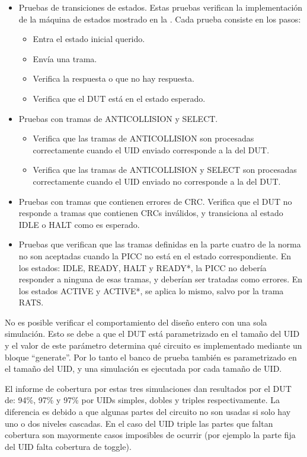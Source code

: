 \documentclass[a4paper, twoside, 11pt]{report}
\begin{document}
\begin{itemize}
  \item Pruebas de transiciones de estados. Estas pruebas verifican la implementación de la máquina de estados mostrado en la . Cada prueba consiste en los pasos:
  \begin{itemize}
    \item Entra el estado inicial querido.
    \item Envía una trama.
    \item Verifica la respuesta o que no hay respuesta.
    \item Verifica que el DUT está en el estado esperado.
  \end{itemize}
  \item Pruebas con tramas de ANTICOLLISION y SELECT.
  \begin{itemize}
    \item Verifica que las tramas de ANTICOLLISION son procesadas correctamente cuando el UID enviado corresponde a la del DUT.
    \item Verifica que las tramas de ANTICOLLISION y SELECT son procesadas correctamente cuando el UID enviado no corresponde a la del DUT.
  \end{itemize}
  \item Pruebas con tramas que contienen errores de CRC. Verifica que el DUT no responde a tramas que contienen CRCs inválidos, y transiciona al estado IDLE o HALT como es esperado.
  \item Pruebas que verifican que las tramas definidas en la parte cuatro de la norma no son aceptadas cuando la PICC no está en el estado correspondiente. En los estados: IDLE, READY, HALT y READY*, la PICC no debería responder a ninguna de esas tramas, y deberían ser tratadas como errores. En los estados ACTIVE y ACTIVE*, se aplica lo mismo, salvo por la trama RATS.
\end{itemize}

No es posible verificar el comportamiento del diseño entero con una sola simulación. Esto se debe a que el DUT está parametrizado en el tamaño del UID y el valor de este parámetro determina qué circuito es implementado mediante un bloque “generate”. Por lo tanto el banco de prueba también es parametrizado en el tamaño del UID, y una simulación es ejecutada por cada tamaño de UID.

El informe de cobertura por estas tres simulaciones dan resultados por el DUT de: 94\%, 97\% y 97\% por UIDs simples, dobles y triples respectivamente. La diferencia es debido a que algunas partes del circuito no son usadas si solo hay uno o dos niveles cascadas. En el caso del UID triple las partes que faltan cobertura son mayormente casos imposibles de ocurrir (por ejemplo la parte fija del UID falta cobertura de toggle).
\end{document}
